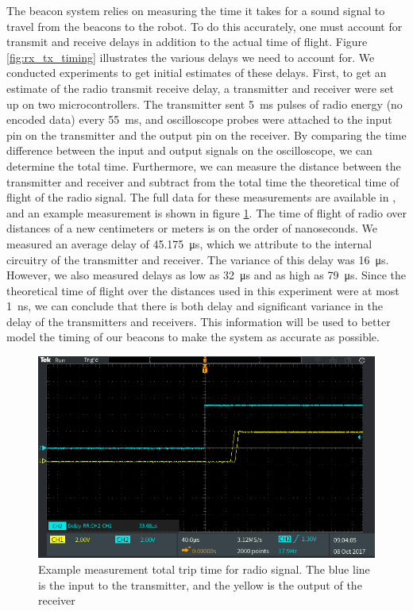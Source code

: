 \documentclass{article}
\begin{document}
      The beacon system relies on measuring the time it takes for a sound signal to travel from the beacons to the robot. To do this accurately, one must account for transmit and receive delays in addition to the actual time of flight. Figure \ref{fig:rx_tx_timing} illustrates the various delays we need to account for. We conducted experiments to get initial estimates of these delays. First, to get an estimate of the radio transmit receive delay, a transmitter and receiver were set up on two microcontrollers. The transmitter sent \SI{5}{\milli\second} pulses of radio energy (no encoded data) every \SI{55}{\milli\second}, and oscilloscope probes were attached to the input pin on the transmitter and the output pin on the receiver. By comparing the time difference between the input and output signals on the oscilloscope, we can determine the total time. Furthermore, we can measure the distance between the transmitter and receiver and subtract from the total time the theoretical time of flight of the radio signal. The full data for these measurements are available in , and an example measurement is shown in figure \ref{fig:rf_delay_ex}. The time of flight of radio over distances of a new centimeters or meters is on the order of nanoseconds. We measured an average delay of \SI{45.175}{\micro\second}, which we attribute to the internal circuitry of the transmitter and receiver. The variance of this delay was \SI{16}{\micro\second}. However, we also measured delays as low as \SI{32}{\micro\second} and as high as \SI{79}{\micro\second}. Since the theoretical time of flight over the distances used in this experiment were at most \SI{1}{\nano\second}, we can conclude that there is both delay and significant variance in the delay of the transmitters and receivers. This information will be used to better model the timing of our beacons to make the system as accurate as possible.

      \begin{figure}
        \centering
        \includegraphics[scale=0.2]{./images/rf_delay_ex.PNG}
        \caption{Example measurement total trip time for radio signal. The blue line is the input to the transmitter, and the yellow is the output of the receiver}
        \label{fig:rf_delay_ex}
      \end{figure}
\end{document}
